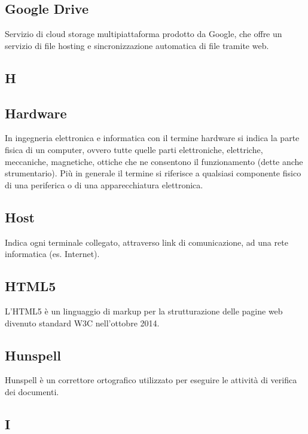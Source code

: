 \subsection*{Google Drive}
Servizio di cloud storage multipiattaforma prodotto da Google, che offre un servizio di file hosting e
sincronizzazione automatica di file tramite web.

\newpage

\begin{center}
\Huge\section*{\uppercase{H}}
\end{center}

\subsection*{Hardware}
In ingegneria elettronica e informatica con il termine hardware si indica la parte fisica
di un computer, ovvero tutte quelle parti elettroniche, elettriche, meccaniche, magnetiche,
ottiche che ne consentono il funzionamento (dette anche strumentario). Più in generale il
termine si riferisce a qualsiasi componente fisico di una periferica o di una apparecchiatura
elettronica.

\subsection*{Host}
Indica ogni terminale collegato, attraverso link di comunicazione, ad una rete informatica (es. Internet).

\subsection*{HTML5}
L'HTML5 è un linguaggio di markup per la strutturazione delle pagine web divenuto standard W3C nell'ottobre 2014.

\subsection*{Hunspell}
Hunspell è un correttore ortografico utilizzato per eseguire le attività di verifica dei documenti.

\newpage

\begin{center}
\Huge\section*{\uppercase{I}}
\end{center}


